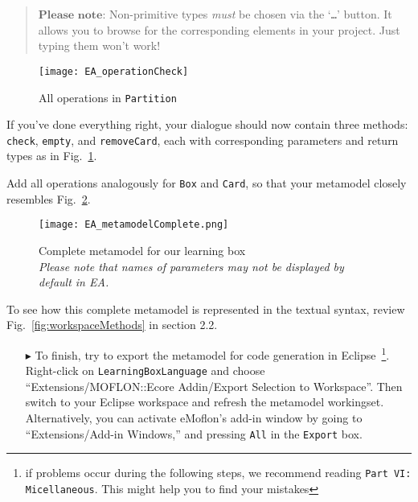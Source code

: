 \vspace{-.5cm}
\begin{quote}
$\textbf{Please note:}$ Non-primitive types \emph{must} be chosen via the `\texttt{\ldots}' button. It allows you to browse for the corresponding elements in
your project. Just typing them won't work!
\end{quote}


\begin{figure}[htbp]
	\centering
  \texttt{[image: EA\_operationCheck]}
	\caption{All operations in \texttt{Partition}}
	\label{fig:operation_partition}
\end{figure}

If you've done everything right, your dialogue should now contain three methods: \texttt{check}, \texttt{empty}, and \texttt{removeCard}, each with
corresponding parameters and return types as in Fig.~\ref{fig:operation_partition}.

Add all operations analogously for \texttt{Box} and \texttt{Card}, so that your metamodel closely resembles Fig.~\ref{fig:metamodel_complete}.

\begin{figure}[htbp]
	\centering
  \texttt{[image: EA\_metamodelComplete.png]}
	\caption[Complete metamodel for our learning box.]{Complete metamodel for our learning box \\ \emph{\small Please note that names of parameters may not be displayed by default in EA.}}
	\label{fig:metamodel_complete}
\end{figure}

\pagebreak

To see how this complete metamodel is represented in the textual syntax, review Fig.~\ref{fig:workspaceMethods} in \hypertarget{sec:static tex}{section 2.2}.

\begin{enumerate}
\item[$\blacktriangleright$] To finish, try to export the metamodel for code generation in Eclipse~\footnote{if problems occur during the following steps, we
recommend reading \texttt{Part VI: Micellaneous}. This might help you to find your mistakes}. Right-click on \texttt{LearningBoxLanguage} and choose
``Extensions/MOFLON::Ecore Addin/Export Selection to Workspace''. Then switch to your Eclipse work\-space and refresh the metamodel workingset. Alternatively,
you can activate eMoflon's add-in window by going to ``Extensions/Add-in Windows,'' and pressing \texttt{All} in the \texttt{Export} box.
\end{enumerate}


